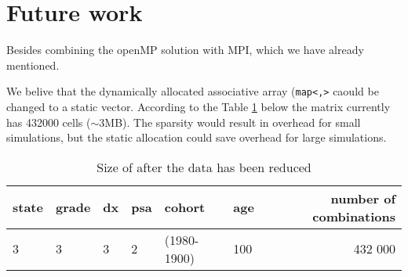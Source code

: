 \section{Future work}
Besides combining the openMP solution with MPI, which we have already
mentioned. 

We belive that the dynamically allocated associative array
(\texttt{map<,>} caould be changed to a static vector. According to the
Table \ref{tab:comb} below the matrix currently has 432000 cells
($\sim$3MB). The sparsity would result in overhead for small
simulations, but the static allocation could save overhead for large simulations.
  
\begin{table}
  \begin{center}
    \begin{tabular}{ | l | l | l | l | l | l | r | }
      \hline
      state & grade & dx & psa & cohort      & age & number of combinations \\
      \hline
      3     & 3     & 3  & 2   & (1980-1900) & 100 & 432 000                \\
      \hline
    \end{tabular}
\end{center}
\caption{Size of after the data has been reduced}
\label{tab:comb}
\end{table}
